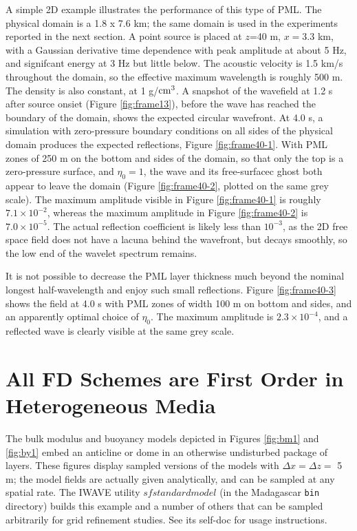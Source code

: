 A simple 2D example illustrates the performance of this type of
PML. The physical 
domain is a 1.8 x 7.6 km; the same domain is used in the experiments
reported in the next section. A point source is placed at $z$=40 m,
$x=3.3$ km, with a Gaussian derivative time dependence with peak
amplitude at about 5 Hz, and signifcant energy at 3 Hz but little below. The acoustic velocity is 1.5 km/s throughout
the domain, so the effective maximum wavelength is roughly 500 m. The
density is also constant, at 1 g/${\rm cm}^3$. A
snapshot of the wavefield at 1.2 s after source onsiet
(Figure \ref{fig:frame13}), before the wave has reached the boundary of the
domain, shows the expected circular wavefront. At 4.0 s, a simulation
with zero-pressure boundary conditions on all sides of the physical
domain produces the expected reflections, Figure \ref{fig:frame40-1}. With
PML zones of 250 m on the bottom and sides of the domain, so that only
the top is a zero-pressure surface, and $\eta_0=1$, the wave and its
free-surfacec ghost both appear to leave the domain
(Figure \ref{fig:frame40-2}, plotted on the same grey scale). The
maximum amplitude visible in Figure \ref{fig:frame40-1} is roughly
$7.1 \times 10^{-2}$, whereas the maximum amplitude in Figure
\ref{fig:frame40-2} is $7.0 \times 10^{-5}$. The actual reflection
coefficient is likely less than $10^{-3}$, as the 2D free space field
does not have a lacuna behind the wavefront, but decays smoothly, so
the low end of the wavelet spectrum remains.

It is not possible to decrease the PML layer thickness much beyond the
nominal longest half-wavelength and enjoy such small
reflections. Figure \ref{fig:frame40-3} shows the field at 4.0 s with
PML zones of width 100 m on bottom and sides, and an apparently
optimal choice of $\eta_0$. The maximum amplitude is $2.3 \times
10^{-4}$, and a reflected wave is clearly visible at the same grey scale.

\section{All FD Schemes are First Order in Heterogeneous Media}

The bulk modulus and buoyancy models
depicted in Figures \ref{fig:bm1} and \ref{fig:by1} embed an anticline or dome in an otherwise
undisturbed package of layers. These
figures display sampled versions of the models with $\Delta x = \Delta
z = $ 5 m; the model fields are actually given analytically, and can
be sampled at any spatial rate. The IWAVE utility $sfstandardmodel$ (in the
Madagascar {\tt bin} directory) builds this example and a number of
others that can be sampled arbitrarily for grid refinement
studies. See its self-doc for usage instructions.

